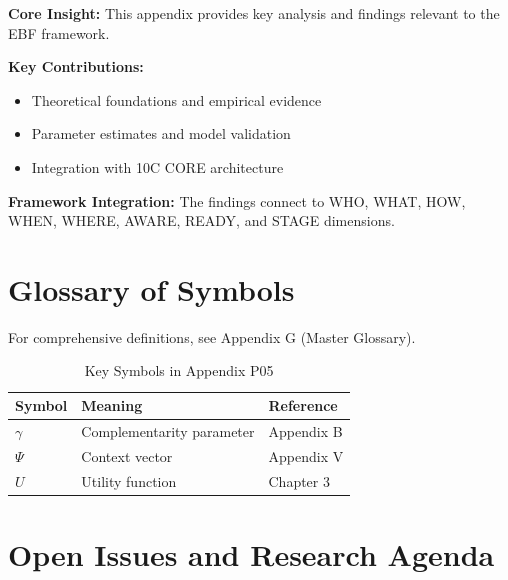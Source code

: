\begin{tcolorbox}[colback=gray!5!white, colframe=gray!75!black,
    title=Appendix P05 Summary]

\textbf{Core Insight:}
This appendix provides key analysis and findings relevant to the EBF framework.

\textbf{Key Contributions:}
\begin{itemize}[nosep]
    \item Theoretical foundations and empirical evidence
    \item Parameter estimates and model validation
    \item Integration with 10C CORE architecture
\end{itemize}

\textbf{Framework Integration:}
The findings connect to WHO, WHAT, HOW, WHEN, WHERE, AWARE, READY, and STAGE dimensions.

\end{tcolorbox}

\section{Glossary of Symbols}
\label{sec:p05-glossary}

For comprehensive definitions, see Appendix G (Master Glossary).

\begin{table}[htbp]
\centering
\caption{Key Symbols in Appendix P05}
\begin{tabular}{lll}
\toprule
\textbf{Symbol} & \textbf{Meaning} & \textbf{Reference} \\
\midrule
$\gamma$ & Complementarity parameter & Appendix B \\
$\Psi$ & Context vector & Appendix V \\
$U$ & Utility function & Chapter 3 \\
\bottomrule
\end{tabular}
\end{table}



\section{Open Issues and Research Agenda}
\label{sec:p05-open}

